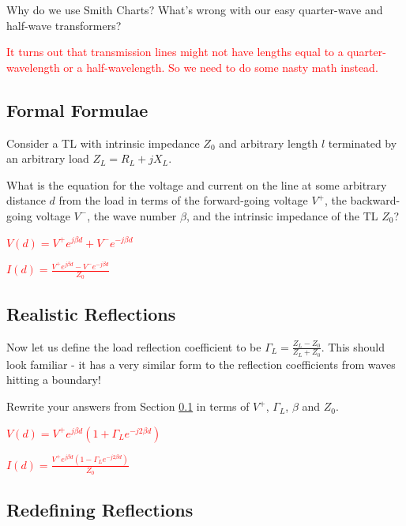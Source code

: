 \documentclass{article}
\begin{document}
Why do we use Smith Charts? What's wrong with our easy quarter-wave and half-wave transformers?

\textcolor{red}{It turns out that transmission lines might not have lengths equal to a quarter-wavelength or a half-wavelength. So we need to do some nasty math instead.}

\vfill

\subsection{Formal Formulae}
\label{section:formal_formulae}

Consider a TL with intrinsic impedance $Z_0$ and arbitrary length $l$ terminated by an arbitrary load $Z_L = R_L + jX_L$.

What is the equation for the voltage and current on the line at some arbitrary distance $d$ from the load in terms of the forward-going voltage $V^+$, the backward-going voltage $V^-$, the wave number $\beta$, and the intrinsic impedance of the TL $Z_0$?

\textcolor{red}{$V(d) = V^+ e^{j\beta d} + V^- e^{-j \beta d}$}

\textcolor{red}{$I(d) = \frac{V^+ e^{j\beta d} - V^- e^{-j \beta d}}{Z_0}$}

\vfill

\subsection{Realistic Reflections}
\label{section:realistic_reflections}

Now let us define the load reflection coefficient to be $\Gamma_L = \frac{Z_L - Z_0}{Z_L + Z_0}$. This should look familiar - it has a very similar form to the reflection coefficients from waves hitting a boundary!

Rewrite your answers from Section \ref{section:formal_formulae} in terms of $V^+$, $\Gamma_L$, $\beta$ and $Z_0$.

\textcolor{red}{$V(d) = V^+ e^{j\beta d}(1 + \Gamma_L e^{-j2 \beta d})$}

\textcolor{red}{$I(d) = \frac{V^+ e^{j\beta d}(1 - \Gamma_L e^{-j2\beta d})}{Z_0}$}

\vfill

\subsection{Redefining Reflections}
\label{section:redefining_reflections}
\end{document}
